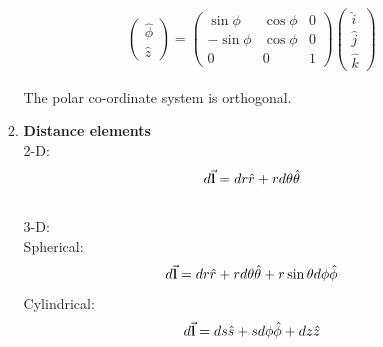\documentclass[12pt, oneside]{book}
\begin{document}
\begin{itemize}
\begin{enumerate}
\begin{gather}
\begin{pmatrix}
	\hat{\phi}\\
	\hat{z}
\end{pmatrix}
=
\begin{pmatrix}
	\sin \phi & \cos \phi & 0 \\
	-\sin\phi & \cos\phi  & 0          \\
	0         & 0         & 1
\end{pmatrix} 
\begin{pmatrix}
	\hat{i}\\
	\hat{j}\\
	\hat{k}
\end{pmatrix}
\end{gather}

The polar co-ordinate system is orthogonal.
   \item \textbf{Distance elements}\\
   2-D: \begin{equation}
   	d\va{\textbf{l}}=dr\hat{r}+rd\theta\hat{\theta}
   \end{equation}\\
   3-D: \\
   Spherical:\\
   \begin{equation}
   	d\va{\textbf{l}}=dr\hat{r}+rd\theta\hat{\theta}+r\sin\theta d\phi \hat{\phi}
   \end{equation}
Cylindrical:\\
   \begin{equation}
   	d\va{\textbf{l}}=ds\hat{s}+sd\phi\hat{\phi}+ dz \hat{z}
   \end{equation}


\end{enumerate}
\end{itemize}
\end{document}
